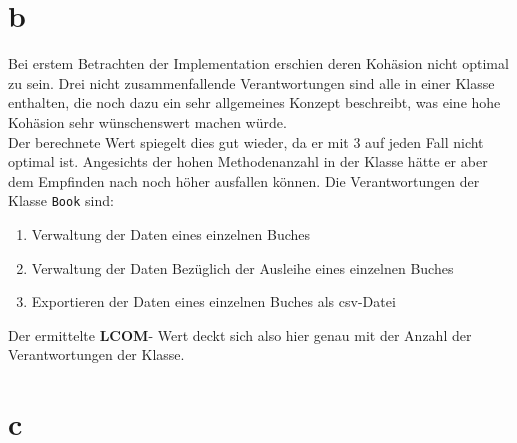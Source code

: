 \section*{b}
Bei erstem Betrachten der Implementation erschien deren Kohäsion nicht optimal zu sein. Drei nicht zusammenfallende Verantwortungen sind alle in einer Klasse enthalten, die noch dazu ein sehr allgemeines Konzept beschreibt, was eine hohe Kohäsion sehr wünschenswert machen würde.\\
Der berechnete Wert spiegelt dies gut wieder, da er mit 3 auf jeden Fall nicht optimal ist. Angesichts der hohen Methodenanzahl in der Klasse hätte er aber dem Empfinden nach noch höher ausfallen können.
Die Verantwortungen der Klasse \texttt{Book} sind:
\begin{enumerate}
	\item Verwaltung der Daten eines einzelnen Buches
	\item Verwaltung der Daten Bezüglich der Ausleihe eines einzelnen Buches
	\item Exportieren der Daten eines einzelnen Buches als csv-Datei
\end{enumerate}
 Der ermittelte \textbf{LCOM}- Wert deckt sich also hier genau mit der Anzahl der Verantwortungen der Klasse.
 
 
\section*{c}

\lstset{language=Java,
	showspaces=false,
	showtabs=false,
	breaklines=true,
	showstringspaces=false,
	breakatwhitespace=true,
}




